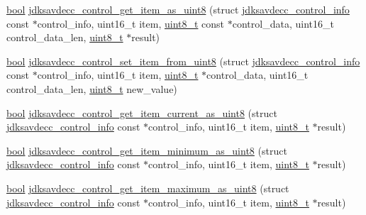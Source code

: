 \begin{DoxyCompactItemize}
\item 
\hyperlink{avb__gptp_8h_af6a258d8f3ee5206d682d799316314b1}{bool} \hyperlink{group__aem__control__value__helpers_ga71f1ad09360628fba089f296428a2ef7}{jdksavdecc\+\_\+control\+\_\+get\+\_\+item\+\_\+as\+\_\+uint8} (struct \hyperlink{structjdksavdecc__control__info}{jdksavdecc\+\_\+control\+\_\+info} const $\ast$control\+\_\+info, uint16\+\_\+t item, \hyperlink{stdint_8h_aba7bc1797add20fe3efdf37ced1182c5}{uint8\+\_\+t} const $\ast$control\+\_\+data, uint16\+\_\+t control\+\_\+data\+\_\+len, \hyperlink{stdint_8h_aba7bc1797add20fe3efdf37ced1182c5}{uint8\+\_\+t} $\ast$result)
\item 
\hyperlink{avb__gptp_8h_af6a258d8f3ee5206d682d799316314b1}{bool} \hyperlink{group__aem__control__value__helpers_ga4fa0162cb01cfd2676cf1f027071d878}{jdksavdecc\+\_\+control\+\_\+set\+\_\+item\+\_\+from\+\_\+uint8} (struct \hyperlink{structjdksavdecc__control__info}{jdksavdecc\+\_\+control\+\_\+info} const $\ast$control\+\_\+info, uint16\+\_\+t item, \hyperlink{stdint_8h_aba7bc1797add20fe3efdf37ced1182c5}{uint8\+\_\+t} $\ast$control\+\_\+data, uint16\+\_\+t control\+\_\+data\+\_\+len, \hyperlink{stdint_8h_aba7bc1797add20fe3efdf37ced1182c5}{uint8\+\_\+t} new\+\_\+value)
\item 
\hyperlink{avb__gptp_8h_af6a258d8f3ee5206d682d799316314b1}{bool} \hyperlink{group__aem__control__value__helpers_ga7f5b1621734746c53edd73cc976d053c}{jdksavdecc\+\_\+control\+\_\+get\+\_\+item\+\_\+current\+\_\+as\+\_\+uint8} (struct \hyperlink{structjdksavdecc__control__info}{jdksavdecc\+\_\+control\+\_\+info} const $\ast$control\+\_\+info, uint16\+\_\+t item, \hyperlink{stdint_8h_aba7bc1797add20fe3efdf37ced1182c5}{uint8\+\_\+t} $\ast$result)
\item 
\hyperlink{avb__gptp_8h_af6a258d8f3ee5206d682d799316314b1}{bool} \hyperlink{group__aem__control__value__helpers_ga9f6e262a828e193be28b052428f6985b}{jdksavdecc\+\_\+control\+\_\+get\+\_\+item\+\_\+minimum\+\_\+as\+\_\+uint8} (struct \hyperlink{structjdksavdecc__control__info}{jdksavdecc\+\_\+control\+\_\+info} const $\ast$control\+\_\+info, uint16\+\_\+t item, \hyperlink{stdint_8h_aba7bc1797add20fe3efdf37ced1182c5}{uint8\+\_\+t} $\ast$result)
\item 
\hyperlink{avb__gptp_8h_af6a258d8f3ee5206d682d799316314b1}{bool} \hyperlink{group__aem__control__value__helpers_ga29d573ecc8d5eca5e2855dd18af57738}{jdksavdecc\+\_\+control\+\_\+get\+\_\+item\+\_\+maximum\+\_\+as\+\_\+uint8} (struct \hyperlink{structjdksavdecc__control__info}{jdksavdecc\+\_\+control\+\_\+info} const $\ast$control\+\_\+info, uint16\+\_\+t item, \hyperlink{stdint_8h_aba7bc1797add20fe3efdf37ced1182c5}{uint8\+\_\+t} $\ast$result)

\end{DoxyCompactItemize}
